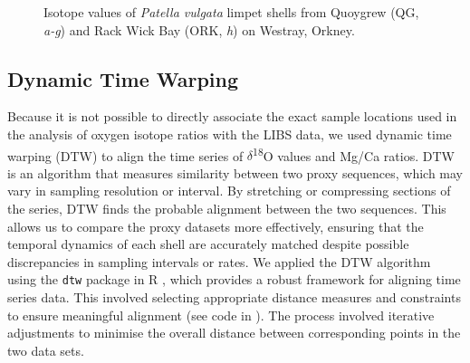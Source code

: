 \documentclass[
  authoryear,
  preprint,
  3p]{elsarticle}
\begin{document}
\begin{figure}[H]


\caption{\label{fig-Pat_iso}Isotope values of \emph{Patella vulgata}
limpet shells from Quoygrew (QG, \emph{a-g}) and Rack Wick Bay (ORK,
\emph{h}) on Westray, Orkney.}

\end{figure}%

\subsection{Dynamic Time Warping}\label{dynamic-time-warping}

Because it is not possible to directly associate the exact sample
locations used in the analysis of oxygen isotope ratios with the LIBS
data, we used dynamic time warping (DTW) to align the time series of
$\delta$\textsuperscript{18}O values and Mg/Ca ratios. DTW is an
algorithm that measures similarity between two proxy sequences, which
may vary in sampling resolution or interval. By stretching or
compressing sections of the series, DTW finds the probable alignment
between the two sequences. This allows us to compare the proxy datasets
more effectively, ensuring that the temporal dynamics of each shell are
accurately matched despite possible discrepancies in sampling intervals
or rates. We applied the DTW algorithm using the \texttt{dtw} package in
R \citep{Giorgino2009-sj, R_Core_Team2020-mk}, which provides a robust
framework for aligning time series data. This involved selecting
appropriate distance measures and constraints to ensure meaningful
alignment (see code in \citep{Hausmann_2024OSF}). The process involved
iterative adjustments to minimise the overall distance between
corresponding points in the two data sets.
\end{document}
